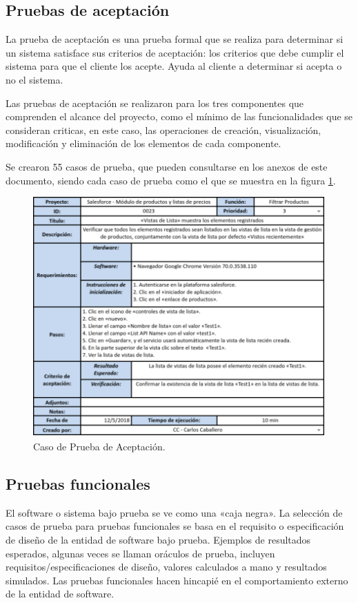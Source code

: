 \subsection{Pruebas de aceptación}
La prueba de aceptación es una prueba formal que se realiza para determinar si
un sistema satisface sus criterios de aceptación: los criterios que debe cumplir
el sistema para que el cliente los acepte. Ayuda al cliente a determinar si
acepta o no el sistema\cite{Naik}.

Las pruebas de aceptación se realizaron para los tres componentes que comprenden
el alcance del proyecto, como el mínimo de las funcionalidades que se consideran
criticas, en este caso, las operaciones de creación, visualización, modificación
y eliminación de los elementos de cada componente.

Se crearon 55 casos de prueba, que pueden consultarse en los anexos de este
documento, siendo cada caso de prueba como el que se muestra en la figura
\ref{tc_acceptance}.

\begin{figure}
\centering
\includegraphics[width=1.0\textwidth]{graphics/tc1-acceptance.eps}
\caption{Caso de Prueba de Aceptación.}
\label{tc_acceptance}
\end{figure}

\subsection{Pruebas funcionales}
El software o sistema bajo prueba se ve como una «caja negra». La selección de
casos de prueba para pruebas funcionales se basa en el requisito o
especificación de diseño de la entidad de software bajo prueba. Ejemplos de
resultados esperados, algunas veces se llaman oráculos de prueba, incluyen
requisitos/especificaciones de diseño, valores calculados a mano y resultados
simulados. Las pruebas funcionales hacen hincapié en el comportamiento externo
de la entidad de software\cite{Luo}.

